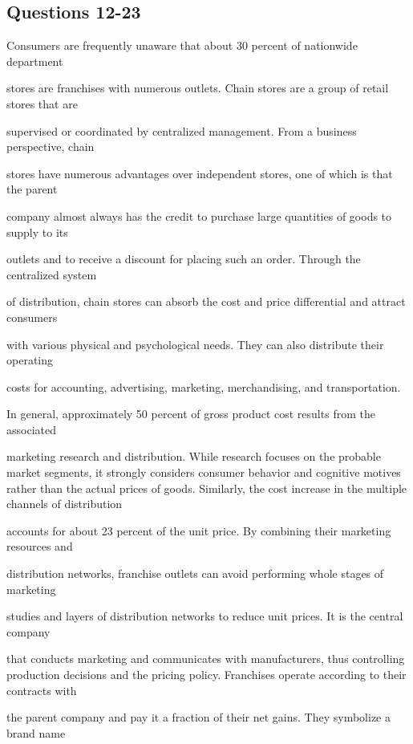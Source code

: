 \documentclass[12pt]{article}
\begin{document}
\subsection*{Questions 12-23}
\begingroup
\small
\sloppy
\setlength{\parskip}{0pt}
\setlength{\parindent}{0pt}
Consumers are frequently unaware that about 30 percent of nationwide department\par
stores are franchises with numerous outlets. Chain stores are a group of retail stores that are\par
supervised or coordinated by centralized management. From a business perspective, chain\par
stores have numerous advantages over independent stores, one of which is that the parent\par
company almost always has the credit to purchase large quantities of goods to supply to its\par
outlets and to receive a discount for placing such an order. Through the centralized system\par
of distribution, chain stores can absorb the cost and price differential and attract consumers\par
with various physical and psychological needs. They can also distribute their operating\par
costs for accounting, advertising, marketing, merchandising, and transportation.\par
In general, approximately 50 percent of gross product cost results from the associated\par
marketing research and distribution. While research focuses on the probable market segments, it strongly considers consumer behavior and cognitive motives rather than the actual prices of goods. Similarly, the cost increase in the multiple channels of distribution\par
accounts for about 23 percent of the unit price. By combining their marketing resources and\par
distribution networks, franchise outlets can avoid performing whole stages of marketing\par
studies and layers of distribution networks to reduce unit prices. It is the central company\par
that conducts marketing and communicates with manufacturers, thus controlling production decisions and the pricing policy. Franchises operate according to their contracts with\par
the parent company and pay it a fraction of their net gains. They symbolize a brand name\par
\end{document}

